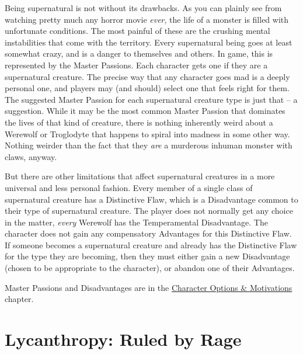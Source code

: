 Being supernatural is not without its drawbacks. As you can plainly see from watching pretty much any horror movie \textit{ever}, the life of a monster is filled with unfortunate conditions. The most painful of these are the crushing mental instabilities that come with the territory. Every supernatural being goes at least somewhat crazy, and is a danger to themselves and others. In game, this is represented by the Master Passions. Each character gets one if they are a supernatural creature. The precise way that any character goes mad is a deeply personal one, and players may (and should) select one that feels right for them. The suggested Master Passion for each supernatural creature type is just that -- a suggestion. While it may be the most common Master Passion that dominates the lives of that kind of creature, there is nothing inherently weird about a Werewolf or Troglodyte that happens to spiral into madness in some other way. Nothing weirder than the fact that they \textit{are} a murderous inhuman monster with claws, anyway.

But there are other limitations that affect supernatural creatures in a more universal and less personal fashion. Every member of a single class of supernatural creature has a Distinctive Flaw, which is a Disadvantage common to their type of supernatural creature. The player does not normally get any choice in the matter, \textit{every} Werewolf has the Temperamental Disadvantage. The character does not gain any compensatory Advantages for this Distinctive Flaw. If someone becomes a supernatural creature and already has the Distinctive Flaw for the type they are becoming, then they must either gain a new Disadvantage (chosen to be appropriate to the character), or abandon one of their Advantages.

Master Passions and Disadvantages are in the \hyperref[chapter:Character Options and Motivations]{Character Options \& Motivations} chapter.

\section[Lycanthropy]{Lycanthropy: Ruled by Rage} 

